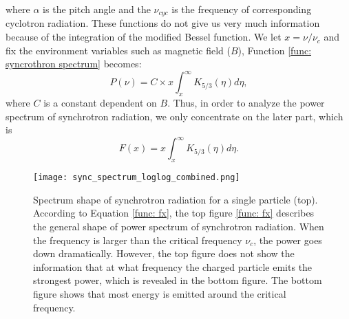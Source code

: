 \documentclass[a4paper, 12pt]{report}
\newcommand{\singleFig}[3]{
  \begin{figure}[!htp]
    \centering
    \texttt{[image: \#1]}
    \caption{#3}
    \label{fig: #1}
  \end{figure}
}
\begin{document}
      where $\alpha$ is the pitch angle and the $\nu_{cyc}$ is the frequency of 
      corresponding cyclotron radiation. These functions do not give us very much 
      information because of the integration of the modified Bessel function. We let 
      $x = \nu / \nu_c$ and fix the environment variables such as magnetic field ($B$), 
      Function \ref{func: syncrothron spectrum} becomes: 
      \begin{equation}
        \label{func: to_x}
        P\left(\nu\right) = C \times x \int_{x}^{\infty} K_{5/3}\left(\eta \right)d\eta ,
      \end{equation}
      where $C$ is a constant dependent on $B$. Thus, in order to analyze the power spectrum of synchrotron radiation,
      we only concentrate on the later part, which is
      \begin{equation}
        \label{func: fx}
        F\left(x\right) = x \int_{x}^{\infty} K_{5/3}\left(\eta \right)d\eta .
      \end{equation}
            
      \begin{figure}[!htp]
        \centering 
        \texttt{[image: sync\_spectrum\_loglog\_combined.png]}
        \caption[Spectrum shape of synchrotron radiation for a single particle]
        {Spectrum shape of synchrotron 
        radiation for a single particle (top). According to Equation \ref{func: fx},
        the top figure \ref{func: fx} describes the general shape of power spectrum of 
        synchrotron radiation. When the frequency is larger than
        the critical frequency $\nu_c$, the power goes down dramatically. However, the 
        top figure does not show the information that at what frequency the charged 
        particle emits the strongest power, which is revealed in the bottom figure. 
        The bottom figure shows that most energy is emitted around the critical frequency.}
        \label{fig: sync_spectrum_loglog_combined}
      \end{figure}
\end{document}
